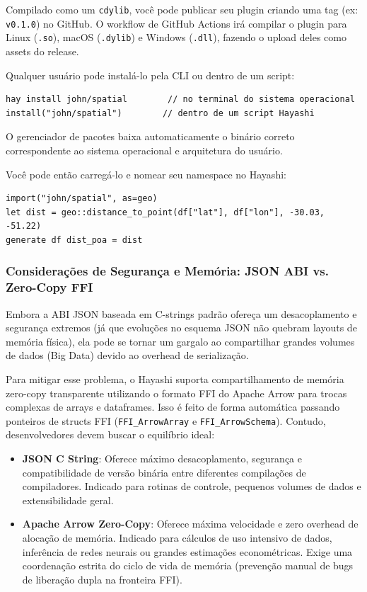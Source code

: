 Compilado como um \texttt{cdylib}, você pode publicar seu plugin criando uma tag (ex: \texttt{v0.1.0}) no GitHub. O workflow de GitHub Actions irá compilar o plugin para Linux (\texttt{.so}), macOS (\texttt{.dylib}) e Windows (\texttt{.dll}), fazendo o upload deles como assets do release.

Qualquer usuário pode instalá-lo pela CLI ou dentro de um script:
\begin{lstlisting}[style=inline, numbers=none, frame=none]
hay install john/spatial        // no terminal do sistema operacional
install("john/spatial")        // dentro de um script Hayashi
\end{lstlisting}
O gerenciador de pacotes baixa automaticamente o binário correto correspondente ao sistema operacional e arquitetura do usuário.

Você pode então carregá-lo e nomear seu namespace no Hayashi:
\begin{lstlisting}
import("john/spatial", as=geo)
let dist = geo::distance_to_point(df["lat"], df["lon"], -30.03, -51.22)
generate df dist_poa = dist
\end{lstlisting}

\subsubsection{Considerações de Segurança e Memória: JSON ABI vs. Zero-Copy FFI}
Embora a ABI JSON baseada em C-strings padrão ofereça um desacoplamento e segurança extremos (já que evoluções no esquema JSON não quebram layouts de memória física), ela pode se tornar um gargalo ao compartilhar grandes volumes de dados (Big Data) devido ao overhead de serialização.

Para mitigar esse problema, o Hayashi suporta compartilhamento de memória zero-copy transparente utilizando o formato FFI do Apache Arrow para trocas complexas de arrays e dataframes. Isso é feito de forma automática passando ponteiros de structs FFI (\texttt{FFI\_ArrowArray} e \texttt{FFI\_ArrowSchema}). Contudo, desenvolvedores devem buscar o equilíbrio ideal:
\begin{itemize}
    \item \textbf{JSON C String}: Oferece máximo desacoplamento, segurança e compatibilidade de versão binária entre diferentes compilações de compiladores. Indicado para rotinas de controle, pequenos volumes de dados e extensibilidade geral.
    \item \textbf{Apache Arrow Zero-Copy}: Oferece máxima velocidade e zero overhead de alocação de memória. Indicado para cálculos de uso intensivo de dados, inferência de redes neurais ou grandes estimações econométricas. Exige uma coordenação estrita do ciclo de vida de memória (prevenção manual de bugs de liberação dupla na fronteira FFI).
\end{itemize}

